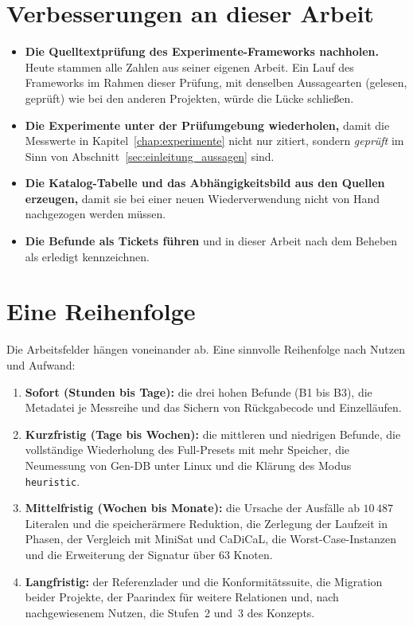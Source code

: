 \section{Verbesserungen an dieser Arbeit}

\begin{itemize}
	\item \textbf{Die Quelltextprüfung des Experimente-Frameworks nachholen.} Heute stammen alle Zahlen aus seiner eigenen Arbeit. Ein Lauf des Frameworks im Rahmen dieser Prüfung, mit denselben Aussagearten (gelesen, geprüft) wie bei den anderen Projekten, würde die Lücke schließen.
	\item \textbf{Die Experimente unter der Prüfumgebung wiederholen,} damit die Messwerte in Kapitel~\ref{chap:experimente} nicht nur zitiert, sondern \emph{geprüft} im Sinn von Abschnitt~\ref{sec:einleitung_aussagen} sind.
	\item \textbf{Die Katalog-Tabelle und das Abhängigkeitsbild aus den Quellen erzeugen,} damit sie bei einer neuen Wiederverwendung nicht von Hand nachgezogen werden müssen.
	\item \textbf{Die Befunde als Tickets führen} und in dieser Arbeit nach dem Beheben als erledigt kennzeichnen.
\end{itemize}

\section{Eine Reihenfolge}
\label{sec:ausblick_reihenfolge}

Die Arbeitsfelder hängen voneinander ab. Eine sinnvolle Reihenfolge nach Nutzen und Aufwand:

\begin{enumerate}
	\item \textbf{Sofort (Stunden bis Tage):} die drei hohen Befunde (B1 bis B3), die Metadatei je Messreihe und das Sichern von Rückgabecode und Einzelläufen.
	\item \textbf{Kurzfristig (Tage bis Wochen):} die mittleren und niedrigen Befunde, die vollständige Wiederholung des Full-Presets mit mehr Speicher, die Neumessung von Gen-DB unter Linux und die Klärung des Modus \texttt{heuristic}.
	\item \textbf{Mittelfristig (Wochen bis Monate):} die Ursache der Ausfälle ab $10\,487$ Literalen und die speicherärmere Reduktion, die Zerlegung der Laufzeit in Phasen, der Vergleich mit MiniSat und CaDiCaL, die Worst-Case-Instanzen und die Erweiterung der Signatur über $63$ Knoten.
	\item \textbf{Langfristig:} der Referenzlader und die Konformitätssuite, die Migration beider Projekte, der Paarindex für weitere Relationen und, nach nachgewiesenem Nutzen, die Stufen~2 und~3 des Konzepts.
\end{enumerate}

